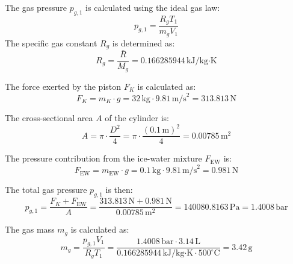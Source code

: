 The gas pressure \( p_{g,1} \) is calculated using the ideal gas law:  
\[
p_{g,1} = \frac{R_g T_1}{m_g V_1}
\]  
The specific gas constant \( R_g \) is determined as:  
\[
R_g = \frac{\bar{R}}{M_g} = 0.166285944 \, \text{kJ/kg·K}
\]  

The force exerted by the piston \( F_K \) is calculated as:  
\[
F_K = m_K \cdot g = 32 \, \text{kg} \cdot 9.81 \, \text{m/s}^2 = 313.813 \, \text{N}
\]  

The cross-sectional area \( A \) of the cylinder is:  
\[
A = \pi \cdot \frac{D^2}{4} = \pi \cdot \frac{(0.1 \, \text{m})^2}{4} = 0.00785 \, \text{m}^2
\]  

The pressure contribution from the ice-water mixture \( F_{\text{EW}} \) is:  
\[
F_{\text{EW}} = m_{\text{EW}} \cdot g = 0.1 \, \text{kg} \cdot 9.81 \, \text{m/s}^2 = 0.981 \, \text{N}
\]  

The total gas pressure \( p_{g,1} \) is then:  
\[
p_{g,1} = \frac{F_K + F_{\text{EW}}}{A} = \frac{313.813 \, \text{N} + 0.981 \, \text{N}}{0.00785 \, \text{m}^2} = 140080.8163 \, \text{Pa} = 1.4008 \, \text{bar}
\]  

The gas mass \( m_g \) is calculated as:  
\[
m_g = \frac{p_{g,1} V_1}{R_g T_1} = \frac{1.4008 \, \text{bar} \cdot 3.14 \, \text{L}}{0.166285944 \, \text{kJ/kg·K} \cdot 500^\circ\text{C}} = 3.42 \, \text{g}
\]